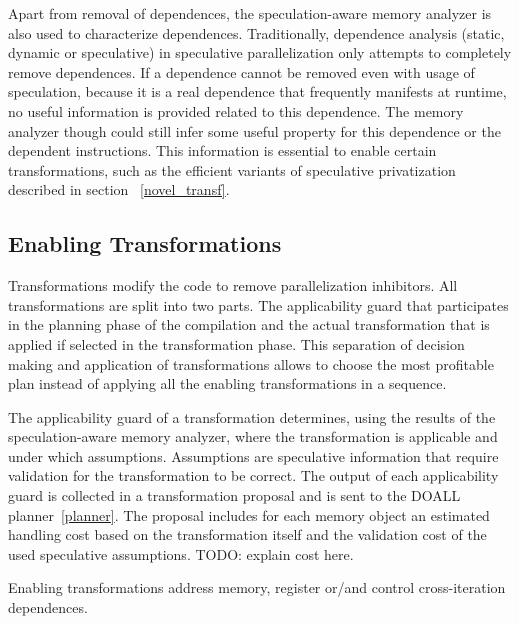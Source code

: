 Apart from removal of dependences, the speculation-aware memory
analyzer is also used to characterize dependences.
%
Traditionally, dependence analysis (static, dynamic or speculative) in
speculative parallelization only attempts to completely remove
dependences.
%
If a dependence cannot be removed even with usage of speculation,
because it is a real dependence that frequently manifests at runtime,
no useful information is provided related to this dependence.
%
The memory analyzer though could still infer some useful property for
this dependence or the dependent instructions.
%
This information is essential to enable certain transformations, such
as the efficient variants of speculative privatization described in
section ~\ref{novel_transf}.


\subsection{Enabling Transformations}

Transformations modify the code to remove parallelization inhibitors.
%
All transformations are split into two parts. The applicability guard
that participates in the planning phase of the compilation and the
actual transformation that is applied if selected in the
transformation phase.
This separation of decision making and application of transformations
allows \name to choose the most profitable plan instead of applying
all the enabling transformations in a sequence.

%
The applicability guard of a transformation determines, using the
results of the speculation-aware memory analyzer, where the
transformation is applicable and under which assumptions. Assumptions
are speculative information that require validation for the
transformation to be correct. 
%
The output of each applicability guard is collected in a
transformation proposal and is sent to the DOALL
planner~\ref{planner}.
%
The proposal includes for each memory object an estimated handling
cost based on the transformation itself and the validation cost of the
used speculative assumptions.
%
TODO: explain cost here.
%

Enabling transformations address memory, register or/and control
cross-iteration dependences. 
%


